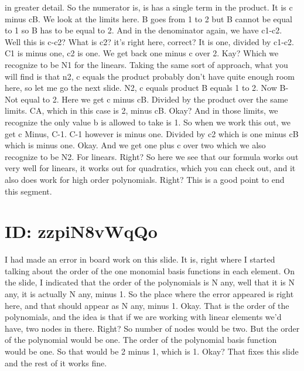 \documentclass[10pt]{article}
\begin{document}
in greater detail. So the numerator is, is has a single term in the product. It is c minus cB. We look at the limits here. B goes from 1 to 2 but B cannot be equal to 1 so B has to be equal to 2. And in the denominator again, we have c1-c2. Well this is c-c2? What is c2? it's right here, correct? It is one, divided by c1-c2. C1 is minus one, c2 is one. We get back one minus c over 2. Kay? Which we recognize to be N1 for the linears. Taking the same sort of approach, what you will find is that n2, c equals the product probably don't have quite enough room here, so let me go the next slide. N2, c equals product B equals 1 to 2. Now B-Not equal to 2. Here we get c minus cB. Divided by the product over the same limits. CA, which in this case is 2, minus cB. Okay? And in those limits, we recognize the only value b is allowed to take is 1. So when we work this out, we get c Minus, C-1. C-1 however is minus one. Divided by c2 which is one minus cB which is minus one. Okay. And we get one plus c over two which we also recognize to be N2. For linears. Right? So here we see that our formula works out very well for linears, it works out for quadratics, which you can check out, and it also does work for high order polynomials. Right? This is a good point to end this segment.

\section*{ID: zzpiN8vWqQo}
I had made an error in board work on this slide. It is, right where I started talking about the order of the one monomial basis functions in each element. On the slide, I indicated that the order of the polynomials is N any, well that it is N any, it is actually N any, minus 1. So the place where the error appeared is right here, and that should appear as N any, minus 1. Okay. That is the order of the polynomials, and the idea is that if we are working with linear elements we'd have, two nodes in there. Right? So number of nodes would be two. But the order of the polynomial would be one. The order of the polynomial basis function would be one. So that would be 2 minus 1, which is 1. Okay? That fixes this slide and the rest of it works fine.
\end{document}
